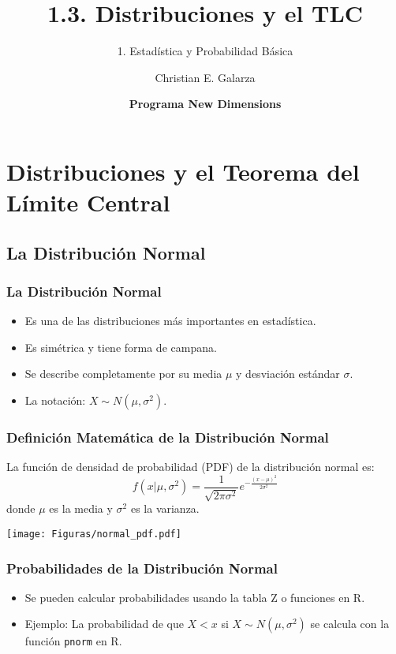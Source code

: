 \documentclass[aspectratio=169]{beamer}
\title[1.3. Distribuciones y el TLC]{\Huge 1.3. Distribuciones y el TLC}
\subtitle{1. Estadística y Probabilidad Básica}
\author{Christian E. Galarza}
\date{\bf Programa New Dimensions}
\begin{document}
\frame{\titlepage}

\section{Distribuciones y el Teorema del Límite Central}

\subsection{La Distribución Normal}
\begin{frame}
\frametitle{La Distribución Normal}
\begin{itemize}
    \item Es una de las distribuciones más importantes en estadística.
    \item Es simétrica y tiene forma de campana.
    \item Se describe completamente por su media \(\mu\) y desviación estándar \(\sigma\).
    \item La notación: \(X \sim N(\mu, \sigma^2)\).
\end{itemize}
\end{frame}

\begin{frame}
\frametitle{Definición Matemática de la Distribución Normal}
La función de densidad de probabilidad (PDF) de la distribución normal es:
\[
f(x | \mu, \sigma^2) = \frac{1}{\sqrt{2\pi\sigma^2}} e^{ -\frac{(x-\mu)^2}{2\sigma^2} }
\]
donde \(\mu\) es la media y \(\sigma^2\) es la varianza.
\end{frame}

\begin{frame}[fragile]

\begin{center}
\texttt{[image: Figuras/normal\_pdf.pdf]}
\end{center}

\end{frame}



\begin{frame}
\frametitle{Probabilidades de la Distribución Normal}
\begin{itemize}
    \item Se pueden calcular probabilidades usando la tabla Z o funciones en R.
    \item Ejemplo: La probabilidad de que \(X < x\) si \(X \sim N(\mu, \sigma^2)\) se calcula con la función \texttt{pnorm} en R.
\end{itemize}
\end{frame}
\end{document}
